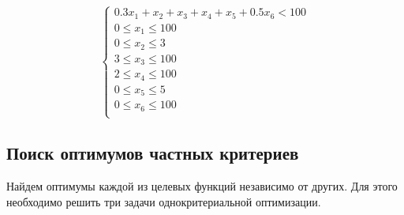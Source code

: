 \documentclass[14pt,a4paper,report]{report}
\begin{document}
\begin{equation*}
 \begin{cases}
     0.3x_1+x_2+x_3+x_4+x_5+0.5x_6 < 100  \\
     0 \leq x_1 \leq 100  \\
     0 \leq x_2 \leq 3   \\
     3 \leq x_3 \leq 100   \\
     2 \leq x_4 \leq 100   \\
     0 \leq x_5 \leq 5  \\
     0 \leq x_6 \leq 100   \\
 \end{cases}
\end{equation*}


 



\subsection{Поиск оптимумов частных критериев}
Найдем оптимумы каждой из целевых функций независимо от других. Для этого необходимо решить три задачи однокритериальной оптимизации.
\end{document}
